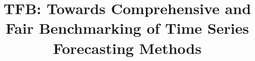 \documentclass[sigconf, nonacm, pdfa]{acmart}
\begin{document}

\title{TFB: Towards Comprehensive and Fair Benchmarking of Time Series Forecasting Methods}








\end{document}
